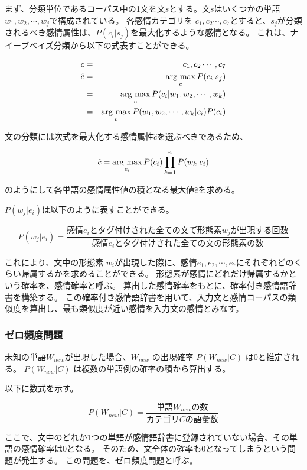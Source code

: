 \documentclass[11pt,a4j]{jsarticle}
\newcommand{\argmax}{\mathop{\rm arg~max}\limits}
\begin{document}
まず、分類単位であるコーパス中の1文を文$s$とする。文$s$はいくつかの単語$w_1,w_2, \cdots ,w_j$で構成されている。
各感情カテゴリを $c_1,c_2 \cdots ,c_7$とすると、$s_j$が分類されるべき感情属性は、$P(c_i|s_j)$を最大化するような感情となる。
これは、ナイーブベイズ分類から以下の式表すことができる。

\begin{eqnarray*}
c & = & {c_1,c_2 \cdots ,c_7}\\
\hat{c} & = & \argmax_{c} P(c_i|s_j) \\
        & = & \argmax_{c} P(c_i|w_1,w_2,\cdots ,w_k) \\
        & = & \argmax_{c} P(w_1,w_2,\cdots ,w_k|c_i)P(c_i) \\
\end{eqnarray*}

文の分類には次式を最大化する感情属性$\hat{c}$を選ぶべきであるため、

\[
\hat{c}=\argmax_{c_i} P(c_i)\prod_{k=1}^n P(w_k|c_i)
\]

のようにして各単語の感情属性値の積となる最大値$\hat{e}$を求める。

$P(w_j|e_i)$は以下のように表すことができる。

\[
P(w_j|e_i)=\frac{感情 e_i とタグ付けされた全ての文で形態素 w_j が出現する回数}{感情 e_i とタグ付けされた全ての文の形態素の数}
\]

これにより、文中の形態素 $w_i$が出現した際に、感情$e_1,e_2, \cdots ,e_7$にそれぞれどのくらい帰属するかを求めることができる。
形態素が感情にどれだけ帰属するかという確率を、感情確率と呼ぶ。
算出した感情確率をもとに、確率付き感情語辞書を構築する。
この確率付き感情語辞書を用いて、入力文と感情コーパスの類似度を算出し、最も類似度が近い感情を入力文の感情とみなす。

\subsubsection{ゼロ頻度問題}\label{sec:zero}
未知の単語$W_\mathit{new}$が出現した場合、$W_\mathit{new}$ の出現確率 $P(W_\mathit{new}|C)$ は0と推定される。
$P(W_\mathit{new}|C)$ は複数の単語例の確率の積から算出する。

以下に数式を示す。

\[
P(W_\mathit{new}|C)=\frac{単語 W_\mathit{new} の数}{カテゴリC の語彙数}
\]

ここで、文中のどれか1つの単語が感情語辞書に登録されていない場合、その単語の感情確率は0となる。
そのため、文全体の確率も0となってしまうという問題が発生する。
この問題を、ゼロ頻度問題と呼ぶ。
\end{document}
